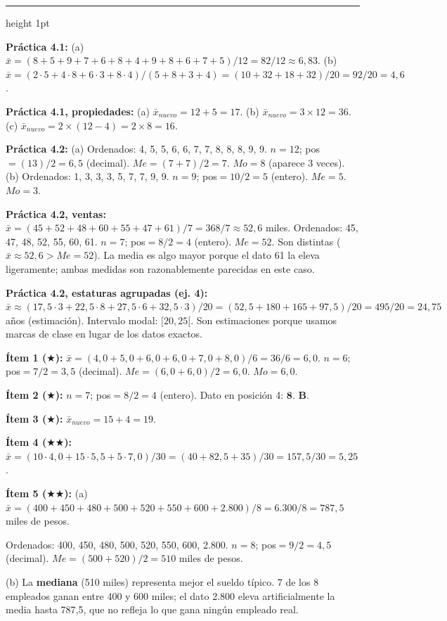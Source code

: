 \documentclass[11pt, letterpaper]{article}
\newcommand{\subbloque}[1]{%
  \vspace{14pt}
  \noindent{\large\bfseries\color{zenitnavy} #1}\par
  \vspace{4pt}\hrule height 1pt\vspace{8pt}}
\begin{document}
\subbloque{Sección 4 --- Medidas de tendencia central}

\textbf{Práctica 4.1:}
(a) $\bar{x} = (8+5+9+7+6+8+4+9+8+6+7+5)/12 = 82/12 \approx 6{,}83$.
(b) $\bar{x} = (2\cdot5+4\cdot8+6\cdot3+8\cdot4)/(5+8+3+4) = (10+32+18+32)/20 = 92/20 = 4{,}6$.

\textbf{Práctica 4.1, propiedades:}
(a) $\bar{x}_{nuevo} = 12+5 = 17$.
(b) $\bar{x}_{nuevo} = 3\times12 = 36$.
(c) $\bar{x}_{nuevo} = 2\times(12-4) = 2\times8 = 16$.

\textbf{Práctica 4.2:}
(a) Ordenados: 4, 5, 5, 6, 6, 7, 7, 8, 8, 8, 9, 9. $n=12$; pos$=(13)/2=6{,}5$ (decimal). $Me=(7+7)/2=7$. $Mo=8$ (aparece 3 veces).
(b) Ordenados: 1, 3, 3, 3, 5, 7, 7, 9, 9. $n=9$; pos$=10/2=5$ (entero). $Me=5$. $Mo=3$.

\textbf{Práctica 4.2, ventas:}
$\bar{x} = (45+52+48+60+55+47+61)/7 = 368/7 \approx 52{,}6$ miles. Ordenados: 45, 47, 48, 52, 55, 60, 61. $n=7$; pos$=8/2=4$ (entero). $Me=52$.
Son distintas ($\bar{x}\approx52{,}6>Me=52$). La media es algo mayor porque el dato 61 la eleva ligeramente; ambas medidas son razonablemente parecidas en este caso.

\textbf{Práctica 4.2, estaturas agrupadas (ej. 4):}
$\bar{x} \approx (17{,}5\cdot3+22{,}5\cdot8+27{,}5\cdot6+32{,}5\cdot3)/20 = (52{,}5+180+165+97{,}5)/20 = 495/20 = 24{,}75$ años (estimación). Intervalo modal: $[20,25[$. Son estimaciones porque usamos marcas de clase en lugar de los datos exactos.

\textbf{Ítem 1 ($\bigstar$):}
$\bar{x} = (4{,}0+5{,}0+6{,}0+6{,}0+7{,}0+8{,}0)/6 = 36/6 = 6{,}0$.
$n=6$; pos$=7/2=3{,}5$ (decimal). $Me=(6{,}0+6{,}0)/2=6{,}0$. $Mo=6{,}0$.

\textbf{Ítem 2 ($\bigstar$):}
$n=7$; pos$=8/2=4$ (entero). Dato en posición 4: $\mathbf{8}$. \textbf{B}.

\textbf{Ítem 3 ($\bigstar$):}
$\bar{x}_{nuevo} = 15+4 = 19$.

\textbf{Ítem 4 ($\bigstar\bigstar$):}
$\bar{x} = (10\cdot4{,}0+15\cdot5{,}5+5\cdot7{,}0)/30 = (40+82{,}5+35)/30 = 157{,}5/30 = 5{,}25$.

\textbf{Ítem 5 ($\bigstar\bigstar$):}
(a) $\bar{x} = (400+450+480+500+520+550+600+2.800)/8 = 6.300/8 = 787{,}5$ miles de pesos.

Ordenados: 400, 450, 480, 500, 520, 550, 600, 2.800. $n=8$; pos$=9/2=4{,}5$ (decimal). $Me=(500+520)/2=510$ miles de pesos.

(b) La \textbf{mediana} (510 miles) representa mejor el sueldo típico. 7 de los 8 empleados ganan entre 400 y 600 miles; el dato 2.800 eleva artificialmente la media hasta 787{,}5, que no refleja lo que gana ningún empleado real.
\end{document}
